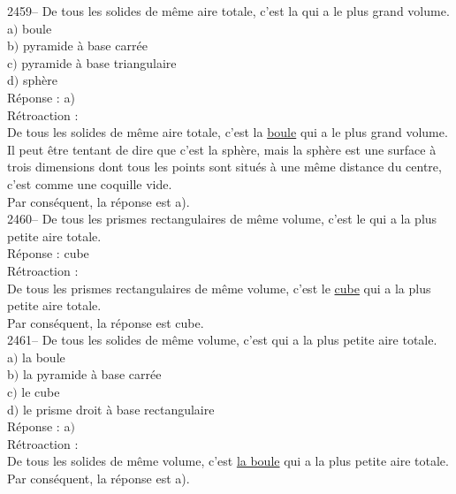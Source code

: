 \documentclass[letterpaper, 12pt]{article}
\begin{document}
2459--  De tous les solides de m\^eme aire totale, c'est la \underline{\qquad\qquad} qui a le plus grand volume.\\

a$)$ boule\\
b$)$ pyramide \`a base carr\'ee\\
c$)$ pyramide \`a base triangulaire\\
d$)$ sph\`ere\\

R\'eponse : a)\\

R\'etroaction :\\
De tous les solides de m\^eme aire totale, c'est la \underline{boule} qui a le plus grand volume.\\
Il peut \^etre tentant de dire que c'est la sph\`ere, mais la sph\`ere est une surface \`a trois dimensions dont tous les points sont situ\'es \`a une m\^eme distance du centre, c'est comme une coquille vide.\\
Par cons\'equent, la r\'eponse est a).\\

2460-- De tous les prismes rectangulaires de m\^eme volume, c'est le \underline{\qquad\qquad} qui a la plus petite aire totale.\\

R\'eponse : cube\\

R\'etroaction :\\
De tous les prismes rectangulaires de m\^eme volume, c'est le \underline{cube} qui a la plus petite aire totale.\\
Par cons\'equent, la r\'eponse est cube.\\

2461-- De tous les solides de m\^eme volume, c'est \underline{\qquad\qquad} qui a la plus petite aire totale.\\

a$)$ la boule\\
b$)$ la pyramide \`a base carr\'ee\\
c$)$ le cube \\
d$)$ le prisme droit \`a base rectangulaire\\

R\'eponse : a$)$\\

R\'etroaction :\\
De tous les solides de m\^eme volume, c'est \underline{la boule} qui a la plus petite aire totale.\\
Par cons\'equent, la r\'eponse est a).\\
\end{document}
